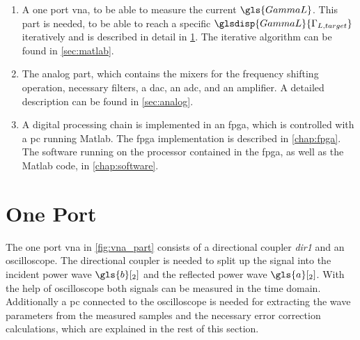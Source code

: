 \documentclass[12pt,a4paper,parskip=full,abstract=true,BCOR=12mm,twoside,open=right]{scrreprt}
\def\device#1{\textit{#1}}
\begin{document}
\begin{enumerate}
    \item A one port \gls{vna}, to be able to measure the current $\gls{GammaL}$. This part is
needed, to be able to reach a specific $\glsdisp{GammaL}{\Gamma_{L,target}}$ iteratively and is
described in detail in \cref{sec:vna}. The iterative algorithm can be found
in \cref{sec:matlab}.
    \item The analog part, which contains the mixers for the frequency shifting operation, necessary
        filters, a \gls{dac}, an \gls{adc}, and an amplifier. A detailed description can be found
        in \cref{sec:analog}.
    \item A digital processing chain is implemented in an \gls{fpga}, which is controlled with
a \gls{pc} running Matlab. The \gls{fpga} implementation is described in \cref{chap:fpga}.
The software running on the processor contained in the \gls{fpga}, as well as the Matlab
code, in \cref{chap:software}.
\end{enumerate}


\section{One Port }
\label{sec:vna}

The one port \gls{vna} in \cref{fig:vna_part} consists of a directional coupler
\device{dir1} and an oscilloscope. The directional coupler is needed to split up
the signal into the incident power wave $\gls{b}[_{2}]$ and the reflected power
wave $\gls{a}[_{2}]$. With the help of oscilloscope both signals can be measured in the
time domain. Additionally a \gls{pc} connected to the oscilloscope is needed
for extracting the wave parameters from the measured samples and the necessary
error correction calculations, which are explained in the rest of this section.
\end{document}
